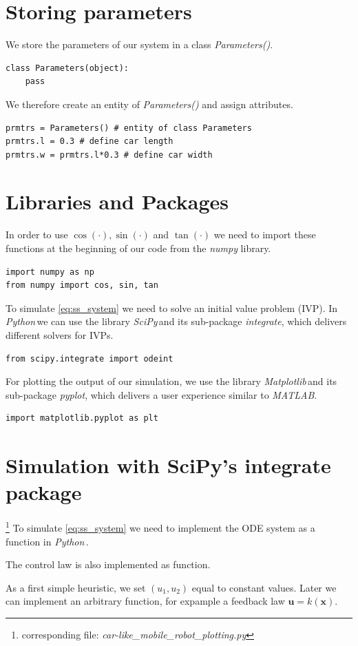 \documentclass[a4paper,11pt,headings=standardclasses]{scrartcl}%
\newcommand{\py}{\emph{Python}\,}
\newcommand{\scipy}{\emph{SciPy}\,}
\newcommand{\mpl}{\emph{Matplotlib}\,}
\newcommand{\uu}{\mathbf{u}}
\newcommand{\x}{\mathbf{x}}
\begin{document}
\section{Storing parameters}
We store the parameters of our system in a class \emph{Parameters()}.
\begin{lstlisting}
class Parameters(object):
    pass
\end{lstlisting}
We therefore create an entity of \emph{Parameters()} and assign attributes.
\begin{lstlisting}
prmtrs = Parameters() # entity of class Parameters
prmtrs.l = 0.3 # define car length
prmtrs.w = prmtrs.l*0.3 # define car width
\end{lstlisting}

\section{Libraries and Packages}
In order to use $\cos(\cdot), \sin(\cdot)$ and $\tan(\cdot)$ we need to import these functions at the beginning of our code from the \emph{numpy} library.
\begin{lstlisting}
import numpy as np 
from numpy import cos, sin, tan
\end{lstlisting}
To simulate \eqref{eq:ss_system} we need to solve an initial value problem (IVP). In \py we can use the library \scipy and its sub-package \emph{integrate}, which delivers different solvers for IVPs.
\begin{lstlisting}
from scipy.integrate import odeint
\end{lstlisting}
For plotting the output of our simulation, we use the library \mpl and its sub-package \emph{pyplot}, which delivers a user experience similar to \emph{MATLAB}.
\begin{lstlisting}
import matplotlib.pyplot as plt
\end{lstlisting}
\section{Simulation with SciPy's integrate package}
\label{sec:simulation}
\footnote{corresponding file: \emph{car-like\_mobile\_robot\_plotting.py}}
To simulate \eqref{eq:ss_system} we need to implement the ODE system as a function in \py.

The control law is also implemented as function.

As a first simple heuristic, we set $(u_1, u_2)$ equal to constant values. Later we can implement an arbitrary function, for expample a feedback law $\uu=k(\x)$.
\end{document}
